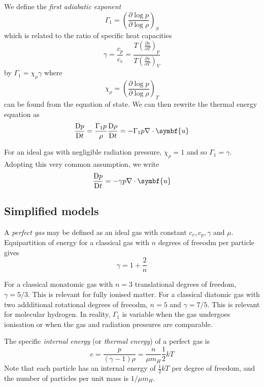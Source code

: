 \documentclass{jknotes}
\begin{document}
We define the \emph{first adiabatic exponent}
\begin{equation}
	\Gamma_1 = \left( \frac{\partial \log p}{\partial \log \rho}\right)_S
\end{equation}
which is related to the ratio of specific heat capacities
\begin{equation}
	\gamma = \frac{c_p}{c_v} = \frac{T \left(\frac{\partial s}{\partial
	T}\right)_p}{T \left( \frac{\partial s}{\partial T}\right)_V}
\end{equation}
by $\Gamma_1 = \chi_\rho \gamma$ where
\begin{equation}
	\chi_\rho = \left( \frac{\partial \log p}{\partial \log \rho}\right)_T
\end{equation}
can be found from the equation of state. We can then rewrite the thermal
energy equation as
\begin{equation}
	\frac{\diffD p}{\diffD t} = \frac{\Gamma_1 p}{\rho} \frac{\diffD
	\rho}{\diffD t} = - \Gamma_1 p \nabla \cdot \symbf{u}
\end{equation}

For an ideal gas with negligible radiation pressure, $\chi_\rho =1$ and so
$\Gamma_1 = \gamma$. Adopting this very common assumption, we write
\begin{equation}
	\frac{\diffD p}{\diffD t} = -\gamma p \nabla \cdot \symbf{u}
\end{equation}

\subsection{Simplified models}
A \emph{perfect gas} may be defined as an ideal gas with constant $c_v, c_p,
\gamma$ and $\mu$. Equipartition of energy for a classical gas with $n$
degrees of freeodm per particle gives
\begin{equation}
	\gamma = 1 + \frac{2}{n}
\end{equation}

For a classical monatomic gas with $n=3$ translational degrees of freedom,
$\gamma = 5/3$. This is relevant for fully ionised matter. For a classical
diatomic gas with two addditional rotational degrees of freeodm, $n=5$ and
$\gamma = 7/5$. This is relevant for molecular hydrogen. In reality,
$\Gamma_1$ is variable when the gas undergoes ionisation or when the gas and
radiation pressures are comparable. 

The specific \emph{internal energy} (or \emph{thermal energy}) of a perfect
gas is
\begin{equation}
	e = \frac{p}{(\gamma-1)\rho} = \frac{n}{\mu m_H} \frac{1}{2}kT
\end{equation}
Note that each particle has an internal energy of $\frac{1}{2}kT$ per degree
of freedom, and the number of particles per unit mass is $1/{\mu m_H}$.
\end{document}
